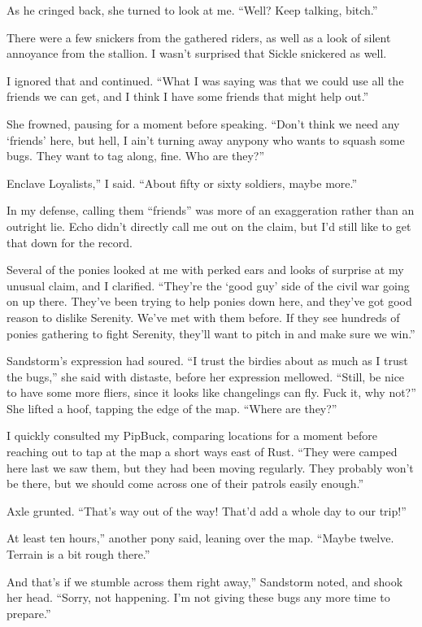 As he cringed back, she turned to look at me. “Well? Keep talking, bitch.”

There were a few snickers from the gathered riders, as well as a look of silent annoyance from the stallion. I wasn’t surprised that Sickle snickered as well.

I ignored that and continued. “What I was saying was that we could use all the friends we can get, and I think I have some friends that might help out.”

She frowned, pausing for a moment before speaking. “Don’t think we need any ‘friends’ here, but hell, I ain’t turning away anypony who wants to squash some bugs. They want to tag along, fine. Who are they?”

\leavevmode{}Enclave Loyalists,” I said. “About fifty or sixty soldiers, maybe more.”

In my defense, calling them “friends” was more of an exaggeration rather than an outright lie. Echo didn’t directly call me out on the claim, but I’d still like to get that down for the record.

Several of the ponies looked at me with perked ears and looks of surprise at my unusual claim, and I clarified. “They’re the ‘good guy’ side of the civil war going on up there. They’ve been trying to help ponies down here, and they’ve got good reason to dislike Serenity. We’ve met with them before. If they see hundreds of ponies gathering to fight Serenity, they’ll want to pitch in and make sure we win.”

Sandstorm’s expression had soured. “I trust the birdies about as much as I trust the bugs,” she said with distaste, before her expression mellowed. “Still, be nice to have some more fliers, since it looks like changelings can fly. Fuck it, why not?” She lifted a hoof, tapping the edge of the map. “Where are they?”

I quickly consulted my PipBuck, comparing locations for a moment before reaching out to tap at the map a short ways east of Rust. “They were camped here last we saw them, but they had been moving regularly. They probably won’t be there, but we should come across one of their patrols easily enough.”

Axle grunted. “That’s way out of the way! That’d add a whole day to our trip!”

\leavevmode{}At least ten hours,” another pony said, leaning over the map. “Maybe twelve. Terrain is a bit rough there.”

\leavevmode{}And that’s if we stumble across them right away,” Sandstorm noted, and shook her head. “Sorry, not happening. I’m not giving these bugs any more time to prepare.”

